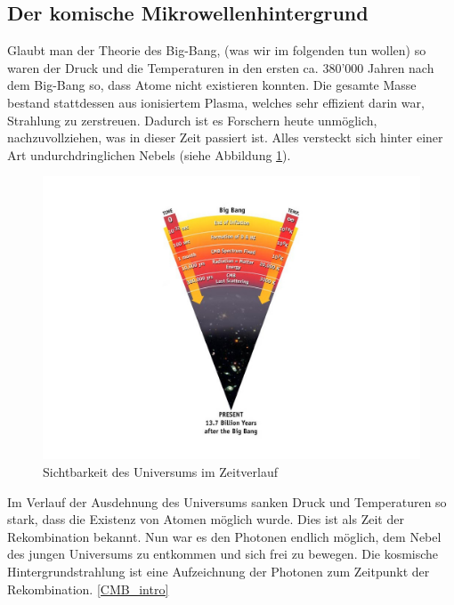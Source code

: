 	\subsection{Der komische Mikrowellenhintergrund}
	Glaubt man der Theorie des Big-Bang, (was wir im folgenden tun wollen) so waren der Druck und die Temperaturen in den ersten ca. 380'000 Jahren nach dem Big-Bang so, dass Atome nicht existieren konnten.
	Die gesamte Masse bestand stattdessen aus ionisiertem Plasma, welches sehr effizient darin war, Strahlung zu zerstreuen.
	Dadurch ist es Forschern heute unmöglich, nachzuvollziehen, was in dieser Zeit passiert ist.
	Alles versteckt sich hinter einer Art undurchdringlichen Nebels (siehe Abbildung \ref{fig:radiation_scattering}).
	\begin{figure}
		\includegraphics[scale=1]{cmb/images/radiation_scattering.jpg}
		\caption{Sichtbarkeit des Universums im Zeitverlauf}
		\label{fig:radiation_scattering}
	\end{figure}
	Im Verlauf der Ausdehnung des Universums sanken Druck und Temperaturen so stark, dass die Existenz von Atomen möglich wurde. Dies ist als Zeit der Rekombination bekannt.
	Nun war es den Photonen endlich möglich, dem Nebel des jungen Universums zu entkommen und sich frei zu bewegen.
	Die kosmische Hintergrundstrahlung ist eine Aufzeichnung der Photonen zum Zeitpunkt der Rekombination.
	\ref{CMB_intro}
	
